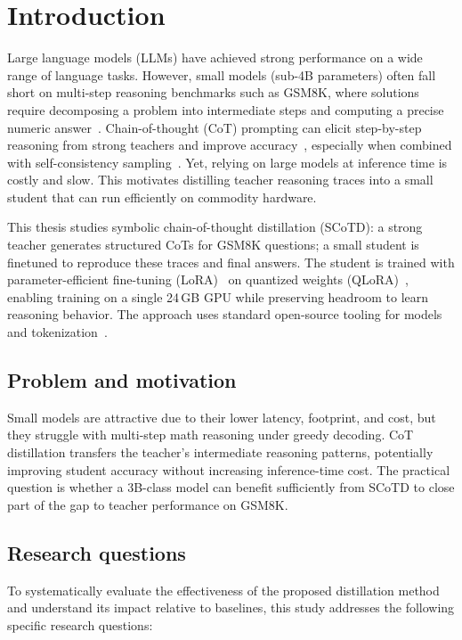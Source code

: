 \chapter{Introduction}

Large language models (LLMs) have achieved strong performance on a wide range of language tasks. However, small models (sub-4B parameters) often fall short on multi-step reasoning benchmarks such as GSM8K, where solutions require decomposing a problem into intermediate steps and computing a precise numeric answer~\cite{cobbe2021trainingverifierssolvemath}. Chain-of-thought (CoT) prompting can elicit step-by-step reasoning from strong teachers and improve accuracy~\cite{wei2023chainofthoughtpromptingelicitsreasoning}, especially when combined with self-consistency sampling~\cite{wang2023selfconsistencyimproveschainthought}. Yet, relying on large models at inference time is costly and slow. This motivates distilling teacher reasoning traces into a small student that can run efficiently on commodity hardware.

This thesis studies symbolic chain-of-thought distillation (SCoTD): a strong teacher generates structured CoTs for GSM8K questions; a small student is finetuned to reproduce these traces and final answers. The student is trained with parameter-efficient fine-tuning (LoRA)~\cite{hu2021loralowrankadaptationlarge} on quantized weights (QLoRA)~\cite{dettmers2023qloraefficientfinetuningquantized}, enabling training on a single 24\,GB GPU while preserving headroom to learn reasoning behavior. The approach uses standard open-source tooling for models and tokenization~\cite{wolf2020huggingfacestransformersstateoftheartnatural,kudo2018sentencepiecesimplelanguageindependent,sennrich2016neuralmachinetranslationrare}.

\section*{Problem and motivation}
Small models are attractive due to their lower latency, footprint, and cost, but they struggle with multi-step math reasoning under greedy decoding. CoT distillation transfers the teacher's intermediate reasoning patterns, potentially improving student accuracy without increasing inference-time cost. The practical question is whether a 3B-class model can benefit sufficiently from SCoTD to close part of the gap to teacher performance on GSM8K.

\section*{Research questions}
To systematically evaluate the effectiveness of the proposed distillation method and understand its impact relative to baselines, this study addresses the following specific research questions:

